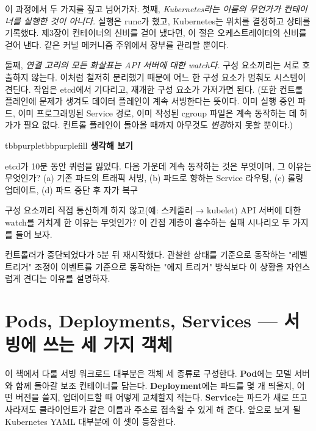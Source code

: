 이 과정에서 두 가지를 짚고 넘어가자. 첫째, \textit{Kubernetes라는 이름의 무언가가 컨테이너를 실행한 것이 아니다.} 실행은 runc가 했고, Kubernetes는 위치를 결정하고 상태를 기록했다. 제3장이 컨테이너의 신비를 걷어 냈다면, 이 절은 오케스트레이터의 신비를 걷어 낸다. 같은 커널 메커니즘 주위에서 장부를 관리할 뿐이다.

둘째, \textit{연결 고리의 모든 화살표는 API 서버에 대한 watch다.} 구성 요소끼리는 서로 호출하지 않는다. 이처럼 철저히 분리했기 때문에 어느 한 구성 요소가 멈춰도 시스템이 견딘다. 작업은 etcd에서 기다리고, 재개한 구성 요소가 가져가면 된다. (또한 컨트롤 플레인에 문제가 생겨도 데이터 플레인이 계속 서빙한다는 뜻이다. 이미 실행 중인 파드, 이미 프로그래밍된 Service 경로, 이미 작성된 cgroup 파일은 계속 동작하는 데 허가가 필요 없다. 컨트롤 플레인이 돌아올 때까지 아무것도 \textit{변경}하지 못할 뿐이다.)

\begin{calloutbox}{tbbpurple}{tbbpurplefill}
{\normalsize\bfseries\color{tbbpurple}생각해 보기}\par\vspace{3pt}
\begin{tbbitemize}
  \item etcd가 10분 동안 쿼럼을 잃었다. 다음 가운데 계속 동작하는 것은 무엇이며, 그 이유는 무엇인가? (a) 기존 파드의 트래픽 서빙, (b) 파드로 향하는 Service 라우팅, (c) 롤링 업데이트, (d) 파드 중단 후 자가 복구
  \item 구성 요소끼리 직접 통신하게 하지 않고(예: 스케줄러 → kubelet) API 서버에 대한 watch를 거치게 한 이유는 무엇인가? 이 간접 계층이 흡수하는 실패 시나리오 두 가지를 들어 보자.
  \item 컨트롤러가 중단되었다가 5분 뒤 재시작했다. 관찰한 상태를 기준으로 동작하는 "레벨 트리거" 조정이 이벤트를 기준으로 동작하는 "에지 트리거" 방식보다 이 상황을 자연스럽게 견디는 이유를 설명하자.
\end{tbbitemize}
\end{calloutbox}

\section{Pods, Deployments, Services — 서빙에 쓰는 세 가지 객체}

이 책에서 다룰 서빙 워크로드 대부분은 객체 세 종류로 구성한다. \textbf{Pod}에는 모델 서버와 함께 돌아갈 보조 컨테이너를 담는다. \textbf{Deployment}에는 파드를 몇 개 띄울지, 어떤 버전을 쓸지, 업데이트할 때 어떻게 교체할지 적는다. \textbf{Service}는 파드가 새로 뜨고 사라져도 클라이언트가 같은 이름과 주소로 접속할 수 있게 해 준다. 앞으로 보게 될 Kubernetes YAML 대부분에 이 셋이 등장한다.

